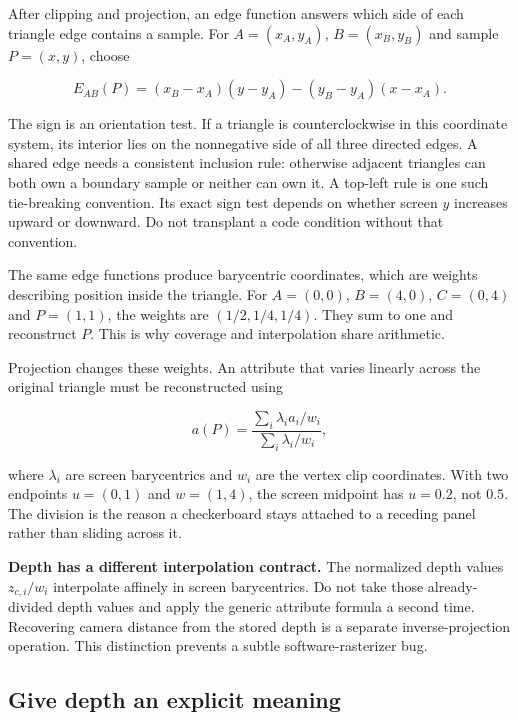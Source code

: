 After clipping and projection, an edge function answers which side of each triangle edge contains a sample. For \(A=(x_A,y_A)\), \(B=(x_B,y_B)\) and sample \(P=(x,y)\), choose

\[
E_{AB}(P)=(x_B-x_A)(y-y_A)-(y_B-y_A)(x-x_A).
\]

The sign is an orientation test. If a triangle is counterclockwise in this coordinate system, its interior lies on the nonnegative side of all three directed edges. A shared edge needs a consistent inclusion rule: otherwise adjacent triangles can both own a boundary sample or neither can own it. A top-left rule is one such tie-breaking convention. Its exact sign test depends on whether screen \(y\) increases upward or downward. Do not transplant a code condition without that convention.

The same edge functions produce barycentric coordinates, which are weights describing position inside the triangle. For \(A=(0,0)\), \(B=(4,0)\), \(C=(0,4)\) and \(P=(1,1)\), the weights are \((1/2,1/4,1/4)\). They sum to one and reconstruct \(P\). This is why coverage and interpolation share arithmetic.

Projection changes these weights. An attribute that varies linearly across the original triangle must be reconstructed using

\[
a(P)=\frac{\sum_i\lambda_i a_i/w_i}{\sum_i\lambda_i/w_i},
\]

where \(\lambda_i\) are screen barycentrics and \(w_i\) are the vertex clip coordinates. With two endpoints \(u=(0,1)\) and \(w=(1,4)\), the screen midpoint has \(u=0.2\), not \(0.5\). The division is the reason a checkerboard stays attached to a receding panel rather than sliding across it.

\textbf{Depth has a different interpolation contract.} The normalized depth values \(z_{c,i}/w_i\) interpolate affinely in screen barycentrics. Do not take those already-divided depth values and apply the generic attribute formula a second time. Recovering camera distance from the stored depth is a separate inverse-projection operation. This distinction prevents a subtle software-rasterizer bug.

\subsection{Give depth an explicit meaning}\label{03-visual-computing-i-ch012-give-depth-an-explicit-meaning}

\hypertarget{03-visual-computing-i-ch012-give-depth-an-explicit-meaning}{}

